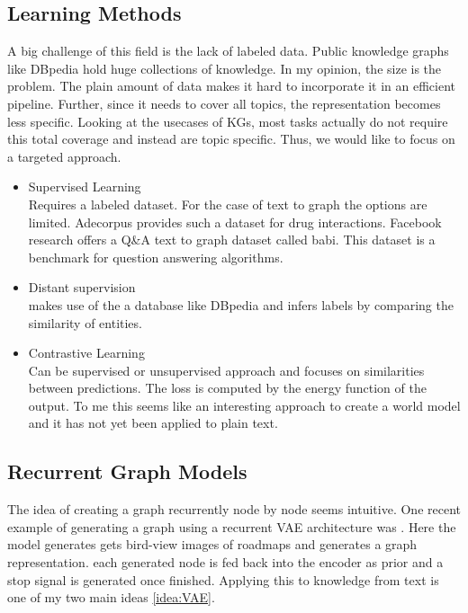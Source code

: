 \subsection{Learning Methods}
A big challenge of this field is the lack of labeled data. Public knowledge graphs like DBpedia hold huge collections of knowledge. In my opinion, the size is the problem. The plain amount of data makes it hard to incorporate it in an efficient pipeline. Further, since it needs to cover all topics, the representation becomes less specific.
Looking at the usecases of KGs, most tasks actually do not require this total coverage and instead are topic specific. Thus, we would like to focus on a targeted approach.
\begin{itemize}
    \item Supervised Learning\\
    Requires a labeled dataset. For the case of text to graph the options are limited. Adecorpus provides such a dataset for drug interactions. Facebook research offers a Q&A text to graph dataset called babi. This dataset is a benchmark for question answering algorithms.\\
    \item Distant supervision\\ 
    makes use of the a database like DBpedia and infers labels by comparing the similarity of entities.\\
    \item Contrastive Learning\\
    Can be supervised or unsupervised approach and focuses on similarities between predictions. The loss is computed by the energy function of the output. To me this seems like an interesting approach to create a world model \cite{kipf_contrastive_2020} and it has not yet been applied to plain text.
\end{itemize}


\subsection{Recurrent Graph Models}
The idea of creating a graph recurrently node by node seems intuitive. One recent example of generating a graph using a recurrent VAE architecture was \cite{belli_image-conditioned_2019}. Here the model generates gets bird-view images of roadmaps and generates a graph representation. each generated node is fed back into the encoder as prior and a stop signal is generated once finished.
Applying this to knowledge from text is one of my two main ideas \ref{idea:VAE}.

